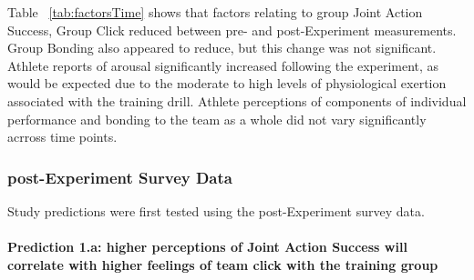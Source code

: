 \documentclass[english]{article}\usepackage[]{graphicx}\usepackage[]{color}
\newcommand{\myparagraph}[1]{\paragraph{#1}\mbox{}\\}
\begin{document}


Table ~\ref{tab:factorsTime} shows that factors relating to group Joint Action Success, Group Click reduced between pre- and post-Experiment measurements.  Group Bonding also appeared to reduce, but this change was not significant.  Athlete reports of arousal significantly increased following the experiment, as would be expected due to the moderate to high levels of physiological exertion associated with the training drill.  Athlete perceptions of components of individual performance and bonding to the team as a whole did not vary significantly acrross time points.


\subsubsection{post-Experiment Survey Data}

Study predictions were first tested using the post-Experiment survey data.

\myparagraph{Prediction 1.a: higher perceptions of Joint Action Success will correlate with higher feelings of team click with the training group}
\end{document}
